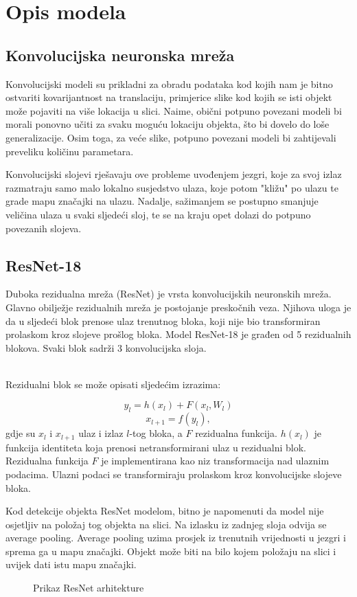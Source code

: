 \chapter{Opis modela}

\section{Konvolucijska neuronska mreža}

Konvolucijski modeli su prikladni za obradu podataka kod kojih nam je bitno ostvariti kovarijantnost na translaciju, primjerice slike kod kojih se isti objekt može pojaviti na više lokacija u slici. Naime, obični potpuno povezani modeli bi morali ponovno učiti za svaku moguću lokaciju objekta, što bi dovelo do loše generalizacije. Osim toga, za veće slike, potpuno povezani modeli bi zahtijevali preveliku količinu parametara.

Konvolucijski slojevi rješavaju ove probleme uvođenjem jezgri, koje za svoj izlaz razmatraju samo malo lokalno susjedstvo ulaza, koje potom "kližu" po ulazu te grade mapu značajki na ulazu. Nadalje, sažimanjem se postupno smanjuje veličina ulaza u svaki sljedeći sloj, te se na kraju opet dolazi do potpuno povezanih slojeva.

\section{ResNet-18}

Duboka rezidualna mreža (ResNet) je vrsta konvolucijskih neuronskih mreža. Glavno obilježje rezidualnih mreža je postojanje preskočnih veza. Njihova uloga je da u sljedeći blok prenose ulaz trenutnog bloka, koji nije bio transformiran prolaskom kroz slojeve prošlog bloka. Model ResNet-18 je građen od 5 rezidualnih blokova. Svaki blok sadrži 3 konvolucijska sloja.

\noindent\\Rezidualni blok se može opisati sljedećim izrazima:

\[y_{l} = h(x_{l}) + F(x_{l}, W_{l})\]
\[x_{l+1} = f(y_{l}),\]
gdje su \(x_{l}\) i \(x_{l+1}\) ulaz i izlaz \(l\)-tog bloka, a \(F\) rezidualna funkcija. \(h(x_{l})\) je funkcija identiteta koja prenosi netransformirani ulaz u rezidualni blok. Rezidualna funkcija \(F\) je implementirana kao niz transformacija nad ulaznim podacima. Ulazni podaci se transformiraju prolaskom kroz konvolucijske slojeve bloka.

Kod detekcije objekta ResNet modelom, bitno je napomenuti da model nije osjetljiv na položaj tog objekta na slici. Na izlasku iz zadnjeg sloja odvija se average pooling. Average pooling uzima prosjek iz trenutnih vrijednosti u jezgri i sprema ga u mapu značajki. Objekt može biti na bilo kojem položaju na slici i uvijek dati istu mapu značajki.

\begin{figure}[h]
	\caption{Prikaz ResNet arhitekture}
	\label{resnet}
\end{figure}